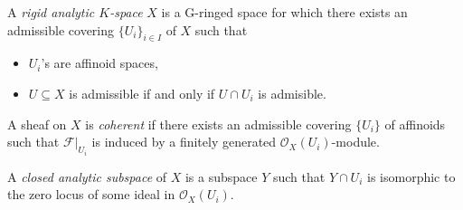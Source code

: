 \documentclass[a4paper]{article}
\newcommand{\sh}[1]{\mathcal{#1}} %
\begin{document}
\begin{definition}
  A \emph{rigid analytic \(K\)-space} \(X\) is a G-ringed space for which there exists an admissible covering \(\{U_i\}_{i \in I}\) of \(X\) such that
  \begin{itemize}
  \item \(U_i\)'s are affinoid spaces,
  \item \(U \subseteq X\) is admissible if and only if \(U \cap U_i\) is admisible.
  \end{itemize}
\end{definition}

\begin{definition}
  A sheaf on \(X\) is \emph{coherent} if there exists an admissible covering \(\{U_i\}\) of affinoids such that \(\sh F|_{U_i}\) is induced by a finitely generated \(\sh O_X(U_i)\)-module.
\end{definition}

\begin{definition}
  A \emph{closed analytic subspace} of \(X\) is a subspace \(Y\) such that \(Y \cap U_i\) is isomorphic to the zero locus of some ideal in \(\sh O_X(U_i)\).
\end{definition}
\end{document}
